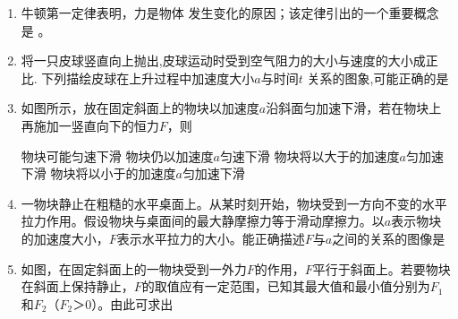 \begin{enumerate}[leftmargin=0em]
\renewcommand{\labelenumi}{\arabic{enumi}.}
\item
{}
牛顿第一定律表明，力是物体  发生变化的原因；该定律引出的一个重要概念是  。


\item 
{}
将一只皮球竖直向上抛出,皮球运动时受到空气阻力的大小与速度的大小成正比. 下列描绘皮球在上升过程中加速度大小$ a $与时间$ t $ 关系的图象,可能正确的是  
\begin{figure}[h!]
\centering

\end{figure}


\item 
{}
如图所示，放在固定斜面上的物块以加速度$ a $沿斜面匀加速下滑，若在物块上再施加一竖直向下的恒力$ F $，则  
\begin{figure}[h!]
\centering

\end{figure}


\fourchoices
{物块可能匀速下滑}
{物块仍以加速度$ a $匀速下滑}
{物块将以大于的加速度$ a $匀加速下滑}
{物块将以小于的加速度$ a $匀加速下滑}

\item 
{}
一物块静止在粗糙的水平桌面上。从某时刻开始，物块受到一方向不变的水平拉力作用。假设物块与桌面间的最大静摩擦力等于滑动摩擦力。以$ a $表示物块的加速度大小，$ F $表示水平拉力的大小。能正确描述$ F $与$ a $之间的关系的图像是  
\begin{figure}[h!]
\centering

\end{figure}

\item 
{}
如图，在固定斜面上的一物块受到一外力$ F $的作用，$ F $平行于斜面上。若要物块在斜面上保持静止，$ F $的取值应有一定范围，已知其最大值和最小值分别为$ F_{1} $和$ F_{2} $（$ F_{2} $＞$ 0 $）。由此可求出  
\begin{figure}[h!]
\centering

\end{figure}



\end{enumerate}
